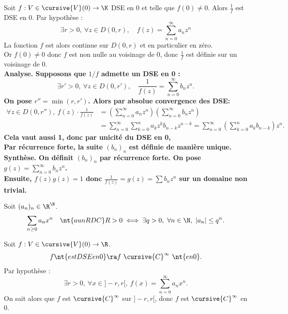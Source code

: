 \documentclass[11pt]{article}
\begin{document}
\begin{prop}{}{}
    Soit $f:V\in \cursive{V}(0) \to \K$ DSE en 0 et telle que $f(0)\neq0$. Alors $\frac{1}{f}$ est DSE en 0.
    \tcblower
    Par hypothèse :
    \begin{equation*}
        \exists r > 0, ~ \forall z \in D(0,r), \quad f(z) = \sum_{n=0}^\infty a_nz^n
    \end{equation*}
    La fonction $f$ est alors continue sur $D(0,r)$ et en particulier en zéro.\\
    Or $f(0)\neq0$ donc $f$ est non nulle au voisinage de 0, donc $\frac{1}{f}$ est définie sur un voisinage de 0.\\
    \bf{Analyse.} Supposons que $1/f$ admette un DSE en 0 :
    \begin{equation*}
        \exists r' > 0, ~ \forall z \in D(0,r'), \quad \frac{1}{f(z)}=\sum_{n=0}^\infty b_nz^n.
    \end{equation*}
    On pose $r''=\min(r,r')$. Alors par absolue convergence des DSE:
    \begin{align*}
        \forall z \in D(0,r''), ~ f(z)\cdot\frac{1}{f(z)}&=\left( \sum_{n=0}^\infty a_nz^n \right)\left( \sum_{n=0}^\infty b_nz^n \right)\\
        &=\sum_{n=0}^\infty\sum_{k=0}^n a_kz^kb_{n-k}z^{n-k} =\sum_{n=0}^\infty\left( \sum_{k=0}^n a_kb_{n-k}\right)z^n.
    \end{align*}
    Cela vaut aussi 1, donc par unicité du DSE en 0, \\
    Par récurrence forte, la suite $(b_n)_n$ est définie de manière unique.\\
    \bf{Synthèse.} On définit $(b_n)_n$ par récurrence forte. On pose $g(z)=\sum_{n=0}^\infty b_nz^n$.\\
    Ensuite, $f(z)g(z)=1$ donc $\frac{1}{f(z)}=g(z)=\sum b_n z^n$ sur un domaine non trivial.
\end{prop}

\begin{ex}{}{}
    Soit $(a_n)_n\in\R^\N$.
    \begin{equation*}
        \sum_{n\geq0}a_nx^n \quad\nt{a un RDC } R>0 \iff \exists q > 0, ~ \forall n \in \N, ~ |a_n|\leq q^n.
    \end{equation*}
\end{ex}

\begin{prop}{}{}
    Soit $f:V\in\cursive{V}(0)\to \R$.
    \begin{equation*}
        f \nt{ est DSE en 0} \ra f ~ \cursive{C}^\infty ~ \nt{ en 0}.
    \end{equation*}
    \tcblower
    Par hypothèse :
    \begin{equation*}
        \exists r > 0, ~ \forall x \in ]-r,r[, ~ f(x)=\sum_{n=0}^\infty a_nx^n.
    \end{equation*}
    On sait alors que $f$ est $\cursive{C}^\infty$ sur $]-r,r[$, donc $f$ est $\cursive{C}^\infty$ en 0.
\end{prop}
\end{document}
